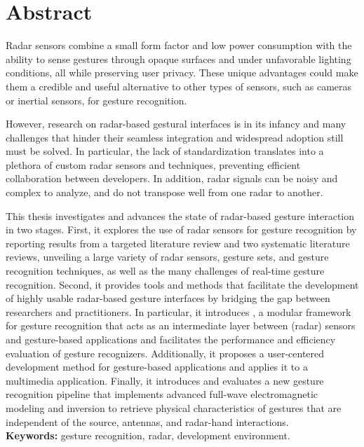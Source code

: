 \chapter*{Abstract}
Radar sensors combine a small form factor and low power consumption with the ability to sense gestures through opaque surfaces and under unfavorable lighting conditions, all while preserving user privacy. 
%
These unique advantages could make them a credible and useful alternative to other types of sensors, such as cameras or inertial sensors, for gesture recognition.

However, research on radar-based gestural interfaces is in its infancy and many challenges that hinder their seamless integration and widespread adoption still must be solved.
%
In particular, the lack of standardization translates into a plethora of custom radar sensors and techniques, preventing efficient collaboration between developers. 
%
In addition, radar signals can be noisy and complex to analyze, and do not transpose well from one radar to another.

This thesis investigates and advances the state of radar-based gesture interaction in two stages.
%
First, it explores the use of radar sensors for gesture recognition by reporting results from a targeted literature review and two systematic literature reviews, unveiling a large variety of radar sensors, gesture sets, and gesture recognition techniques, as well as the many challenges of real-time gesture recognition.
%
Second, it provides tools and methods that facilitate the development of highly usable radar-based gesture interfaces by bridging the gap between researchers and practitioners.
%
In particular, it introduces \ql, a modular framework for gesture recognition that acts as an intermediate layer between (radar) sensors and gesture-based applications and facilitates the performance and efficiency evaluation of gesture recognizers.
%
Additionally, it proposes a user-centered development method for gesture-based applications and applies it to a multimedia application.
%
Finally, it introduces and evaluates a new gesture recognition pipeline that implements advanced full-wave electromagnetic modeling and inversion to retrieve physical characteristics of gestures that are independent of the source, antennas, and radar-hand interactions.
\\[10pt]
\textbf{Keywords:} gesture recognition, radar, development environment.
